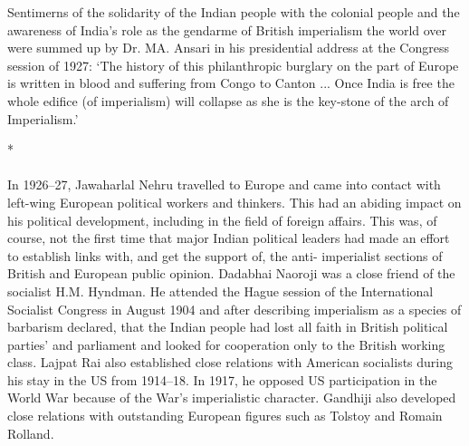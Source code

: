 Sentimerns of the solidarity of the Indian people with the colonial people and the awareness of India's role as the gendarme of British imperialism the world over were summed up by Dr. MA. Ansari in his presidential address at the Congress session of 1927: `The history of this philanthropic burglary on the part of Europe is written in blood and suffering from Congo to Canton ... Once India is free the whole edifice (of imperialism) will collapse as she is the key-stone of the arch of Imperialism.'

\begin{center}*\end{center}

\paragraph*{}

In 1926--27, Jawaharlal Nehru travelled to Europe and came into contact with left-wing European political workers and thinkers. This had an abiding impact on his political development, including in the field of foreign affairs. This was, of course, not the first time that major Indian political leaders had made an effort to establish links with, and get the support of, the anti- imperialist sections of British and European public opinion. Dadabhai Naoroji was a close friend of the socialist H.M. Hyndman. He attended the Hague session of the International Socialist Congress in August 1904 and after describing imperialism as a species of barbarism declared, that the Indian people had lost all faith in British political parties' and parliament and looked for cooperation only to the British working class. Lajpat Rai also established close relations with American socialists during his stay in the US from 1914--18. In 1917, he opposed US participation in the World War because of the War's imperialistic character. Gandhiji also developed close relations with outstanding European figures such as Tolstoy and Romain Rolland. 

